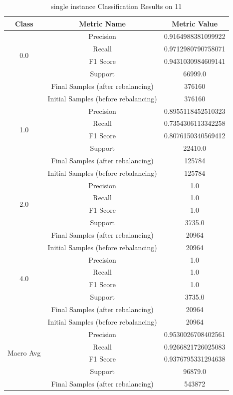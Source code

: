 \begin{longtable}{|c|c|c|}
\caption{single instance Classification Results on 11} \label{tab:11_single_instance_classifiers_results} \\
\hline
Class & Metric Name & Metric Value \\
\hline
\multirow{4}{*}{0.0} & Precision & 0.9164988381099922 \\
 & Recall & 0.9712980790758071 \\
 & F1 Score & 0.9431030984609141 \\
 & Support & 66999.0 \\
 & Final Samples (after rebalancing) & 376160 \\
 & Initial Samples (before rebalancing) & 376160 \\
\hline
\multirow{4}{*}{1.0} & Precision & 0.8955118452510323 \\
 & Recall & 0.7354306113342258 \\
 & F1 Score & 0.8076150340569412 \\
 & Support & 22410.0 \\
 & Final Samples (after rebalancing) & 125784 \\
 & Initial Samples (before rebalancing) & 125784 \\
\hline
\multirow{4}{*}{2.0} & Precision & 1.0 \\
 & Recall & 1.0 \\
 & F1 Score & 1.0 \\
 & Support & 3735.0 \\
 & Final Samples (after rebalancing) & 20964 \\
 & Initial Samples (before rebalancing) & 20964 \\
\hline
\multirow{4}{*}{4.0} & Precision & 1.0 \\
 & Recall & 1.0 \\
 & F1 Score & 1.0 \\
 & Support & 3735.0 \\
 & Final Samples (after rebalancing) & 20964 \\
 & Initial Samples (before rebalancing) & 20964 \\
\hline
\multirow{4}{*}{Macro Avg} & Precision & 0.9530026708402561 \\
 & Recall & 0.9266821726025083 \\
 & F1 Score & 0.9376795331294638 \\
 & Support & 96879.0 \\
 & Final Samples (after rebalancing) & 543872 \\

\end{longtable}

